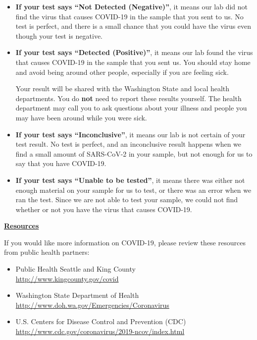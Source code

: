 \documentclass[10pt]{article}
\begin{document}
\begin{itemize}


\item

  \textbf{If your test says ``Not Detected (Negative)''}, it means our lab did not find the
  virus that causes COVID-19 in the sample that you sent to us. No test is
  perfect, and there is a small chance that you could have the virus even though
  your test is negative.

\item

  \textbf{If your test says ``Detected (Positive)''}, it means our
  lab found the virus that causes COVID-19 in the sample that you sent us. You
  should stay home and avoid being around other people, especially if you are
  feeling sick.

  Your result will be shared with the Washington State and local health
  departments. You do \textbf{not} need to report these results yourself. The
  health department may call you to ask questions about your illness and people
  you may have been around while you were sick.

\item

  \textbf{If your test says ``Inconclusive''}, it means our lab is not certain
  of your test result. No test is perfect, and an inconclusive result happens
  when we find a small amount of SARS-CoV-2 in your sample, but not enough for
  us to say that you have COVID-19.

\item

  \textbf{If your test says ``Unable to be tested''}, it means there was either
  not enough material on your sample for us to test, or there was an error when
  we ran the test. Since we are not able to test your sample, we could not find
  whether or not you have the virus that causes COVID-19.

\end{itemize}

\bigskip

\large \underline{\textbf{Resources}}

If you would like more information on COVID-19, please review these resources
from public health partners:

\begin{itemize}
\item
  Public Health Seattle and King County\\
  \url{http://www.kingcounty.gov/covid}

\item

  Washington State Department of Health\\
  \url{http://www.doh.wa.gov/Emergencies/Coronavirus}

\item
  U.S. Centers for Disease Control and Prevention (CDC)\\
  \url{http://www.cdc.gov/coronavirus/2019-ncov/index.html}

\end{itemize}
\end{document}
